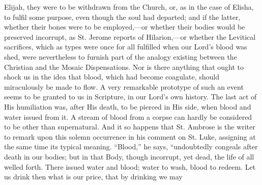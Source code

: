 Elijah, they were to be withdrawn from the Church, or, as in the
case of Elisha, to fulfil some purpose, even though the soul had
departed; and if the latter, whether their bones were to be
employed,—or whether their bodies would be preserved incorrupt, as
St. Jerome reports of Hilarion,—or whether the Levitical sacrifices,
which as types were once for all fulfilled when our Lord's blood was
shed, were nevertheless to furnish part of the analogy existing
between the Christian and the Mosaic Dispensations. Nor is there
anything that ought to shock us in the idea that blood, which had
become coagulate, should miraculously be made to flow. A very
remarkable prototype of such an event seems to be granted to us in
Scripture, in our Lord's own history. The last act of His humiliation
was, after His death, to be pierced in His side, when blood and water
issued from it. A stream of blood from a corpse can hardly be
considered to be other than supernatural. And it so happens that St.
Ambrose is the writer to remark upon this solemn occurrence in his
comment on St. Luke, assigning at the same time its typical meaning.
``Blood,'' he says, ``undoubtedly congeals after death in our
bodies; but in that Body, though incorrupt, yet dead, the life of all
welled forth. There issued water and blood; water to wash, blood to
redeem. Let us drink then what is our price, that by drinking we may
